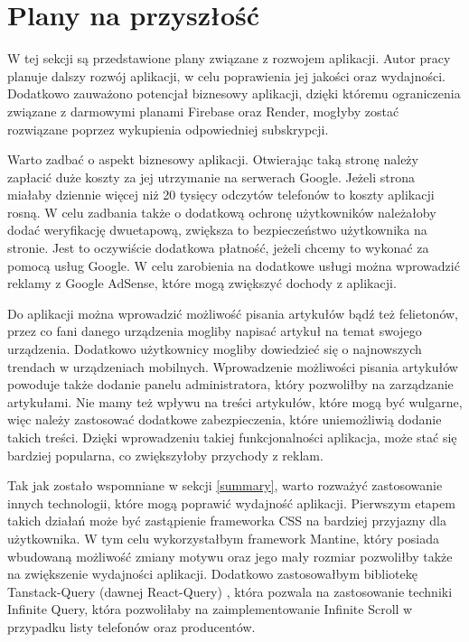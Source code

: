 \section{Plany na przyszłość}\label{future_plans}
W tej sekcji są przedstawione plany związane z rozwojem aplikacji. Autor pracy planuje dalszy rozwój aplikacji, w celu poprawienia jej jakości oraz wydajności. Dodatkowo zauważono potencjał biznesowy aplikacji, dzięki któremu ograniczenia związane z darmowymi planami Firebase oraz Render, mogłyby zostać rozwiązane poprzez wykupienia odpowiedniej subskrypcji.  

Warto zadbać o aspekt biznesowy aplikacji. Otwierając taką stronę należy zapłacić duże koszty za jej utrzymanie na serwerach Google. Jeżeli strona miałaby dziennie więcej niż 20 tysięcy odczytów telefonów to koszty aplikacji rosną. W celu zadbania także o dodatkową ochronę użytkowników należałoby dodać weryfikację dwuetapową, zwiększa to bezpieczeństwo użytkownika na stronie. Jest to oczywiście dodatkowa płatność, jeżeli chcemy to wykonać za pomocą usług Google. W celu zarobienia na dodatkowe usługi można wprowadzić reklamy z Google AdSense, które mogą zwiększyć dochody z aplikacji.

Do aplikacji można wprowadzić możliwość pisania artykułów bądź też felietonów, przez co fani danego urządzenia mogliby napisać artykuł na temat swojego urządzenia. Dodatkowo użytkownicy mogliby dowiedzieć się o najnowszych trendach w urządzeniach mobilnych. Wprowadzenie możliwości pisania artykułów powoduje także dodanie panelu administratora, który pozwoliłby na zarządzanie artykułami. Nie mamy też wpływu na treści artykułów, które mogą być wulgarne, więc należy zastosować dodatkowe zabezpieczenia, które uniemożliwią dodanie takich treści. Dzięki wprowadzeniu takiej funkcjonalności aplikacja, może stać się bardziej popularna, co zwiększyłoby przychody z reklam.

Tak jak zostało wspomniane w sekcji \ref{summary}, warto rozważyć zastosowanie innych technologii, które mogą poprawić wydajność aplikacji. Pierwszym etapem takich działań może być zastąpienie frameworka CSS na bardziej przyjazny dla użytkownika. W tym celu wykorzystałbym framework Mantine, który posiada wbudowaną możliwość zmiany motywu oraz jego mały rozmiar pozwoliłby także na zwiększenie wydajności aplikacji. Dodatkowo zastosowałbym bibliotekę Tanstack-Query (dawnej React-Query) \cite{tanstack_query}, która pozwala na zastosowanie techniki Infinite Query, która pozwoliłaby na zaimplementowanie Infinite Scroll \cite{infinite_scroll} w przypadku listy telefonów oraz producentów.

